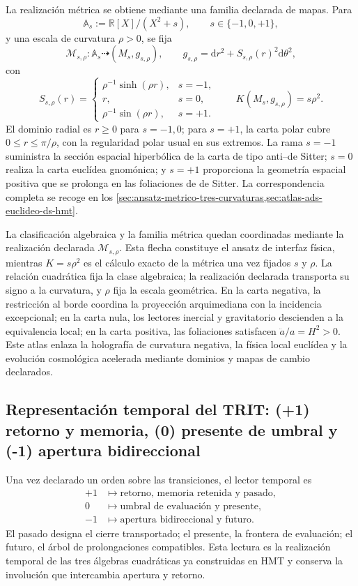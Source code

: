 La realización métrica se obtiene mediante una familia declarada de mapas.
Para
\[
 \mathbb A_s:=\mathbb R[X]/(X^2+s),
 \qquad s\in\{-1,0,+1\},
\]
y una escala de curvatura \(\rho>0\), se fija
\[
 \mathcal M_{s,\rho}:\mathbb A_s\dashrightarrow
 (M_s,g_{s,\rho}),
 \qquad
 g_{s,\rho}=\mathrm d r^2+S_{s,\rho}(r)^2\mathrm d\theta^2,
\]
con
\[
 S_{s,\rho}(r)=
 \begin{cases}
  \rho^{-1}\sinh(\rho r),&s=-1,\\
  r,&s=0,\\
  \rho^{-1}\sin(\rho r),&s=+1.
 \end{cases}
 \qquad
 K(M_s,g_{s,\rho})=s\rho^2.
\]
El dominio radial es \(r\geq0\) para \(s=-1,0\); para \(s=+1\), la carta
polar cubre \(0\leq r\leq\pi/\rho\), con la regularidad polar usual en sus
extremos. La rama \(s=-1\) suministra la sección espacial hiperbólica de la
carta de tipo anti--de Sitter; \(s=0\) realiza la carta euclídea gnomónica;
y \(s=+1\) proporciona la geometría espacial positiva que se prolonga en
las foliaciones de de Sitter. La correspondencia completa se recoge en los
\cref{sec:ansatz-metrico-tres-curvaturas,sec:atlas-ads-euclideo-ds-hmt}.

La clasificación algebraica y la familia métrica quedan coordinadas mediante
la realización declarada \(\mathcal M_{s,\rho}\). Esta flecha constituye el
ansatz de interfaz física, mientras
\(K=s\rho^2\) es el cálculo exacto de la métrica una vez fijados \(s\) y
\(\rho\). La relación cuadrática fija la clase algebraica; la realización
declarada transporta su signo a la curvatura, y \(\rho\) fija la escala
geométrica. En la carta negativa, la restricción al borde coordina la
proyección arquimediana con la incidencia excepcional; en la carta nula, los
lectores inercial y gravitatorio descienden a la equivalencia local; en la
carta positiva, las foliaciones satisfacen \(\ddot a/a=H^2>0\). Este atlas
enlaza la holografía de curvatura negativa, la física local euclídea y la
evolución cosmológica acelerada mediante dominios y mapas de cambio
declarados.

\subsection{Representación temporal del TRIT: (+1) retorno y memoria, (0) presente de umbral y (-1) apertura bidireccional}

Una vez declarado un orden sobre las transiciones, el lector temporal es
\[
\begin{aligned}
 +1&\longmapsto\text{retorno, memoria retenida y pasado},\\
 0&\longmapsto\text{umbral de evaluación y presente},\\
 -1&\longmapsto\text{apertura bidireccional y futuro}.
\end{aligned}
\]
El pasado designa el cierre transportado; el presente, la frontera de
evaluación; el futuro, el árbol de prolongaciones compatibles. Esta lectura
es la realización temporal de las tres álgebras cuadráticas ya construidas
en HMT y conserva la involución que intercambia apertura y retorno.

